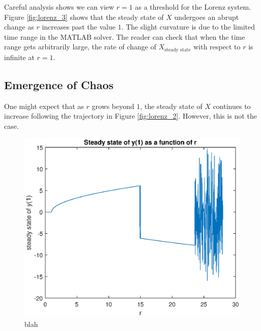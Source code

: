 \documentclass[twocolumn,amsmath,amssymb,aps]{revtex4}
\begin{document}
Careful analysis shows we can view $r = 1$ as a threshold for the Lorenz system. Figure \ref{fig:lorenz_3} shows that the steady state of $X$ undergoes an abrupt change as $r$ increases past the value $1$. The slight curvature is due to the limited time range in the MATLAB solver. The reader can check that when the time range gets arbitrarily large, the rate of change of $X_{\text{steady state}}$ with respect to $r$ is infinite at $r=1$. 

\subsection{Emergence of Chaos}
One might expect that as $r$ grows beyond $1$, the steady state of $X$ continues to increase following the trajectory in Figure \ref{fig:lorenz_2}. However, this is not the case. 
\begin{figure}[!htb]
	\centering
	\includegraphics[scale=0.5]{bifurcation_chaos}
	\caption{blah}
	\label{fig:bifurcation_chaos}
\end{figure}
\end{document}
